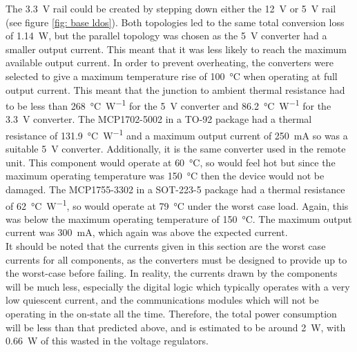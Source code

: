 The \SI{3.3}{\volt} rail could be created by stepping down either the \SI{12}{\volt} or \SI{5}{\volt} rail (see figure \ref{fig: base ldos}). Both topologies led to the same total conversion loss of \SI{1.14}{\watt}, but the parallel topology was chosen as the \SI{5}{\volt} converter had a smaller output current. This meant that it was less likely to reach the maximum available output current. In order to prevent overheating, the converters were selected to give a maximum temperature rise of \SI{100}{\celsius} when operating at full output current. This meant that the junction to ambient thermal resistance had to be less than \SI{268}{\celsius\per\watt} for the \SI{5}{\volt} converter and \SI{86.2}{\celsius\per\watt} for the \SI{3.3}{\volt} converter. The MCP1702-5002 \cite{mcp1702} in a TO-92 package had a thermal resistance of \SI{131.9}{\celsius\per\watt} and a maximum output current of \SI{250}{\milli\ampere} so was a suitable \SI{5}{\volt} converter. Additionally, it is the same converter used in the remote unit. This component would operate at \SI{60}{\celsius}, so would feel hot but since the maximum operating temperature was \SI{150}{\celsius} then the device would not be damaged. The MCP1755-3302 \cite{mcp1755} in a SOT-223-5 package had a thermal resistance of \SI{62}{\celsius\per\watt}, so would operate at \SI{79}{\celsius} under the worst case load. Again, this was below the maximum operating temperature of \SI{150}{\celsius}. The maximum output current was \SI{300}{\milli\ampere}, which again was above the expected current.\\

It should be noted that the currents given in this section are the worst case currents for all components, as the converters must be designed to provide up to the worst-case before failing. In reality, the currents drawn by the components will be much less, especially the digital logic which typically operates with a very low quiescent current, and the communications modules which will not be operating in the on-state all the time. Therefore, the total power consumption will be less than that predicted above, and is estimated to be around \SI{2}{\watt}, with \SI{0.66}{\watt} of this wasted in the voltage regulators.\\



